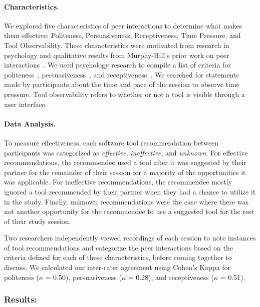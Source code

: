 \paragraph{Characteristics.} We explored five characteristics of peer interactions to determine what makes them effective: Politeness, Persuasiveness, Receptiveness, Time Pressure, and Tool Observability. These characteristics were motivated from research in psychology and qualitative results from Murphy-Hill's prior work on peer interactions~\cite{Murphy-Hill2015HowDoUsers}. We used psychology research to compile a list of criteria for politeness~\cite{LeechPolite}, persuasiveness~\cite{ShenPersuasive}, and receptiveness~\cite{Fogg2009Persuasive}. We searched for statements made by participants about the time and pace of the session to observe time pressure. Tool observability refers to whether or not a tool is visible through a user interface. 
 
\paragraph{Data Analysis.} To measure effectiveness, each software tool recommendation between participants was categorized as \textit{effective}, \textit{ineffective}, and \textit{unknown}. For effective recommendations, the recommendee used a tool after it was suggested by their partner for the remainder of their session for a majority of the opportunities it was applicable. For ineffective recommendations, the recommendee mostly ignored a tool recommended by their partner when they had a chance to utilize it in the study. Finally, unknown recommendations were the case where there was not another opportunity for the recommendee to use a suggested tool for the rest of their study session.

Two researchers independently viewed recordings of each session to note instances of tool recommendations and categorize the peer interactions based on the criteria defined for each of these characteristics, before coming together to discuss. We calculated our inter-rater agreement using Cohen's Kappa for politeness ($\kappa$ = 0.50), persuasiveness ($\kappa$ = 0.28), and 
receptiveness ($\kappa$ = 0.51).

\subsubsection{Results:}

